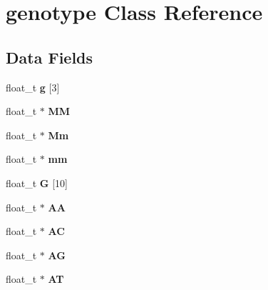 \hypertarget{classgenotype}{\section{genotype Class Reference}
\label{classgenotype}
}
\subsection*{Data Fields}
\begin{DoxyCompactItemize}
\item 
\hypertarget{classgenotype_ad68609e97a38000aab20ce478488c7fd}{float\-\_\-t {\bfseries g} \mbox{[}3\mbox{]}}\label{classgenotype_ad68609e97a38000aab20ce478488c7fd}

\item 
\hypertarget{classgenotype_afa83e470648514270103fbc16eb28e04}{float\-\_\-t $\ast$ {\bfseries M\-M}}\label{classgenotype_afa83e470648514270103fbc16eb28e04}

\item 
\hypertarget{classgenotype_a3a4e7df382a178139d84dce6ea87533d}{float\-\_\-t $\ast$ {\bfseries Mm}}\label{classgenotype_a3a4e7df382a178139d84dce6ea87533d}

\item 
\hypertarget{classgenotype_ac982fff0db8eeb0480db6e9f222166d3}{float\-\_\-t $\ast$ {\bfseries mm}}\label{classgenotype_ac982fff0db8eeb0480db6e9f222166d3}

\item 
\hypertarget{classgenotype_a6456521f60204fb029254bd071531032}{float\-\_\-t {\bfseries G} \mbox{[}10\mbox{]}}\label{classgenotype_a6456521f60204fb029254bd071531032}

\item 
\hypertarget{classgenotype_ac4900e7047ab9f9aadb346bdf230aeb2}{float\-\_\-t $\ast$ {\bfseries A\-A}}\label{classgenotype_ac4900e7047ab9f9aadb346bdf230aeb2}

\item 
\hypertarget{classgenotype_a6669094fb124b080c7e6f1c6af46376c}{float\-\_\-t $\ast$ {\bfseries A\-C}}\label{classgenotype_a6669094fb124b080c7e6f1c6af46376c}

\item 
\hypertarget{classgenotype_a38e3741e2f9fcf5913954e55d24ecbd8}{float\-\_\-t $\ast$ {\bfseries A\-G}}\label{classgenotype_a38e3741e2f9fcf5913954e55d24ecbd8}

\item 
\hypertarget{classgenotype_a9aa529092d26b0aecd202c401593e754}{float\-\_\-t $\ast$ {\bfseries A\-T}}\label{classgenotype_a9aa529092d26b0aecd202c401593e754}


\end{DoxyCompactItemize}
